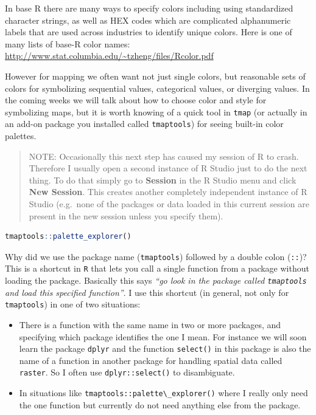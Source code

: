 \documentclass[
]{book}
\newcommand{\passthrough}[1]{#1}
\providecommand{\tightlist}{%
  \setlength{\itemsep}{0pt}\setlength{\parskip}{0pt}}
\begin{document}
In base R there are many ways to specify colors including using standardized character strings, as well as HEX codes which are complicated alphanumeric labels that are used across industries to identify unique colors. Here is one of many lists of base-R color names: \url{http://www.stat.columbia.edu/~tzheng/files/Rcolor.pdf}

However for mapping we often want not just single colors, but reasonable sets of colors for symbolizing sequential values, categorical values, or diverging values. In the coming weeks we will talk about how to choose color and style for symbolizing maps, but it is worth knowing of a quick tool in \passthrough{\lstinline!tmap!} (or actually in an add-on package you installed called \passthrough{\lstinline!tmaptools!}) for seeing built-in color palettes.

\begin{quote}
NOTE: Occasionally this next step has caused my session of R to crash. Therefore I usually open a second instance of R Studio just to do the next thing. To do that simply go to \textbf{Session} in the R Studio menu and click \textbf{New Session}. This creates another completely independent instance of R Studio (e.g.~none of the packages or data loaded in this current session are present in the new session unless you specify them).
\end{quote}

\begin{lstlisting}[language=R]
tmaptools::palette_explorer()
\end{lstlisting}

Why did we use the package name (\passthrough{\lstinline!tmaptools!}) followed by a double colon (\passthrough{\lstinline!::!})? This is a shortcut in \passthrough{\lstinline!R!} that lets you call a single function from a package without loading the package. Basically this says \emph{``go look in the package called \passthrough{\lstinline!tmaptools!} and load this specified function''}. I use this shortcut (in general, not only for \passthrough{\lstinline!tmaptools!}) in one of two situations:

\begin{itemize}
\tightlist
\item
  There is a function with the same name in two or more packages, and specifying which package identifies the one I mean. For instance we will soon learn the package \passthrough{\lstinline!dplyr!} and the function \passthrough{\lstinline!select()!} in this package is also the name of a function in another package for handling spatial data called \passthrough{\lstinline!raster!}. So I often use \passthrough{\lstinline!dplyr::select()!} to disambiguate.
\item
  In situations like \passthrough{\lstinline!tmaptools::palette\_explorer()!} where I really only need the one function but currently do not need anything else from the package.
\end{itemize}
\end{document}
